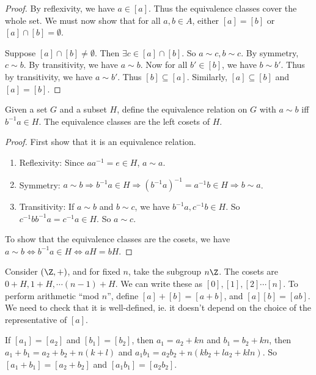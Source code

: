 \documentclass[a4paper]{article}
\begin{document}
\begin{proof}
  By reflexivity, we have $a\in [a]$. Thus the equivalence classes cover the whole set. We must now show that for all $a, b\in A$, either $[a] = [b]$ or $[a]\cap [b]=\emptyset$.

  Suppose $[a]\cap[b]\not=\emptyset$. Then $\exists c\in [a]\cap[b]$. So $a\sim c, b\sim c$. By symmetry, $c\sim b$. By transitivity, we have $a\sim b$. Now for all $b'\in [b]$, we have $b\sim b'$. Thus by transitivity, we have $a\sim b'$. Thus $[b]\subseteq[a]$. Similarly, $[a]\subseteq[b]$  and $[a] = [b]$.
\end{proof}

\begin{lemma}
  Given a set $G$ and a subset $H$, define the equivalence relation on $G$ with $a\sim b$ iff $b^{-1}a\in H$. The equivalence classes are the left cosets of $H$.
\end{lemma}

\begin{proof}
  First show that it is an equivalence relation.
  \begin{enumerate}
    \item Reflexivity: Since $aa^{-1} = e\in H$,  $a\sim a$.
    \item Symmetry: $a\sim b\Rightarrow b^{-1}a\in H \Rightarrow (b^{-1}a)^{-1} = a^{-1}b\in H\Rightarrow b\sim a$.
    \item Transitivity: If $a\sim b$ and $b\sim c$, we have $b^{-1}a, c^{-1}b\in H$. So $c^{-1}bb^{-1}a = c^{-1}a\in H$. So $a\sim c$.
  \end{enumerate}
  To show that the equivalence classes are the cosets, we have $a\sim b\Leftrightarrow b^{-1}a\in H \Leftrightarrow aH = bH$.
\end{proof}

\begin{eg}
  Consider $(\Z, +)$, and for fixed $n$, take the subgroup $n\Z$. The cosets are $0+ H, 1 + H, \cdots (n - 1)+H$. We can write these as $[0], [1], [2] \cdots [n]$. To perform arithmetic ``mod $n$'', define $[a] + [b] = [a + b]$, and $[a][b] = [ab]$. We need to check that it is well-defined, ie. it doesn't depend on the choice of the representative of $[a]$.

  If $[a_1] = [a_2]$ and $[b_1] = [b_2]$, then $a_1 = a_2 + kn$ and $b_1 = b_2 + kn$, then $a_1 + b_1 = a_2 + b_2 + n(k + l)$ and $a_1b_1 = a_2b_2 + n(kb_2 +la_2 + kln)$. So $[a_1 + b_1] = [a_2 + b_2]$ and $[a_1b_1] = [a_2b_2]$.
\end{eg}
\end{document}

